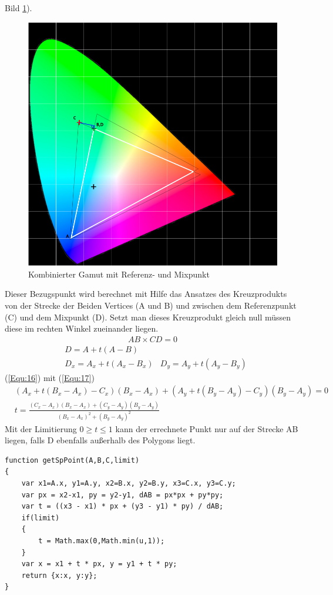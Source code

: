 \documentclass[11pt]{scrartcl}
\begin{document}
Bild \ref{fig:refCombined}).
\begin{figure}[H]
    \begin{center}
        \includegraphics[width=.7\textwidth]{images/combined_gamut_with_mix_point_and_math.png}
    \end{center}
    \caption{Kombinierter Gamut mit Referenz- und Mixpunkt}\label{fig:refCombined}
\end{figure}
\noindent
Dieser Bezugspunkt wird berechnet mit Hilfe das Ansatzes des Kreuzprodukts von der Strecke der Beiden Vertices (A und B) und zwischen dem Referenzpunkt (C)
und dem Mixpunkt (D). Setzt man dieses Kreuzprodukt gleich null müssen diese im rechten Winkel zueinander liegen.
\begin{align}\label{Equ:16}
    AB \times CD = 0
\end{align}
\begin{align}\label{Equ:17}
    &D = A + t(A - B)\\
    &D_x = A_x + t(A_x - B_x)
    &D_y = A_y + t(A_y - B_y)
\end{align}
(\ref{Equ:16}) mit (\ref{Equ:17})
\begin{align}\label{Equ:18}
    &(A_x+t(B_x-A_x)-C_x)(B_x-A_x)+(A_y+t(B_y-A_y)-C_y)(B_y-A_y)=0\\
    &t = \frac{(C_x-A_x)(B_x-A_x)+(C_y-A_y)(B_y-A_y)}{(B_x-A_x)^2+(B_y-A_y)^2}
\end{align}
Mit der Limitierung $0 \geq t \leq 1$ kann der errechnete Punkt nur auf der Strecke AB liegen, falls D ebenfalls außerhalb des Polygons liegt.\\
\begin{lstlisting}[caption=Mixpunktermittlung]
function getSpPoint(A,B,C,limit)
{
    var x1=A.x, y1=A.y, x2=B.x, y2=B.y, x3=C.x, y3=C.y;
    var px = x2-x1, py = y2-y1, dAB = px*px + py*py;
    var t = ((x3 - x1) * px + (y3 - y1) * py) / dAB;
    if(limit)
    {
        t = Math.max(0,Math.min(u,1));
    }
    var x = x1 + t * px, y = y1 + t * py;
    return {x:x, y:y};
}
\end{lstlisting}
\end{document}
